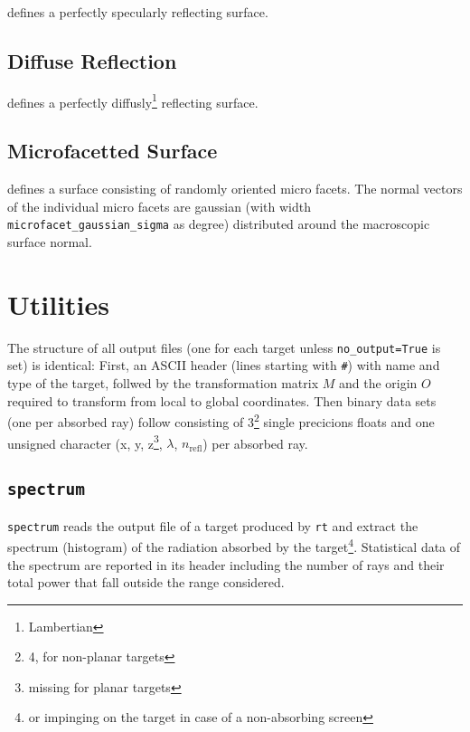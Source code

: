 \documentclass[10pt,a4paper,titlepage]{article}
\newcommand{\rt}{{\tt rt} }
\begin{document}
 defines a perfectly specularly reflecting surface.

\subsection{Diffuse Reflection}

 defines a perfectly diffusly\footnote{Lambertian} reflecting surface.

\subsection{Microfacetted Surface}

 defines a surface consisting of randomly oriented micro facets. The normal vectors of the individual micro facets are gaussian (with width {\tt microfacet\_gaussian\_sigma} as degree) distributed around the macroscopic surface normal.



\section{Utilities}

The structure of all output files (one for each target unless {\tt no\_output=True} is set) is identical: First, an ASCII header (lines starting with {\tt \#}) with name and type of the target, follwed by the transformation matrix $M$ and the origin $O$ required to transform from local to global coordinates. Then binary data sets (one per absorbed ray) follow consisting of 3\footnote{4, for non-planar targets} single precicions floats and one unsigned character (x, y, z\footnote{missing for planar targets}, $\lambda$, $n_{\mathrm{refl}}$) per absorbed ray.   

\subsection{{\tt spectrum}}

{\tt spectrum} reads the output file of a target produced by \rt and extract the spectrum (histogram) of the radiation absorbed by the target\footnote{or impinging on the target in case of a non-absorbing screen}. Statistical data of the spectrum are reported in its header including the number of rays and their total power that fall outside the range considered.
\end{document}
